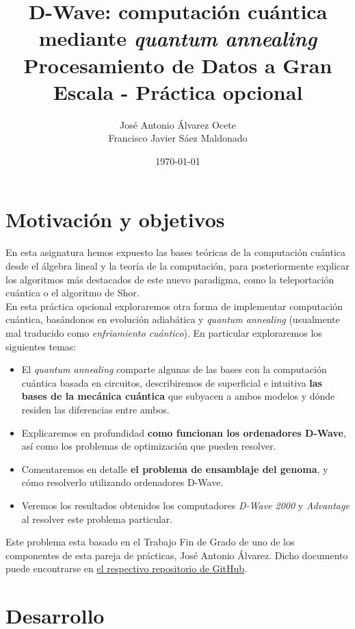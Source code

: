 \documentclass[11pt]{article}
\author{José Antonio Álvarez Ocete\\ Francisco Javier Sáez Maldonado}
\date{\today}
\title{D-Wave: computación cuántica mediante \emph{quantum annealing}\\\medskip
\large Procesamiento de Datos a Gran Escala - Práctica opcional}
\begin{document}
\maketitle

\tableofcontents

\section{Motivación y objetivos}

En esta asignatura hemos expuesto las bases teóricas de la computación cuántica desde el álgebra lineal y la teoría de la computación, para posteriormente explicar los algoritmos más destacados de este nuevo paradigma, como la teleportación cuántica o el algoritmo de Shor. \\

En esta práctica opcional exploraremos otra forma de implementar computación cuántica, basándonos en evolución adiabática y \emph{quantum annealing} (usualmente mal traducido como \emph{enfriamiento cuántico}). En particular exploraremos los siguientes temas:

\begin{itemize}
	\item El \emph{quantum annealing} comparte algunas de las bases con la computación cuántica basada en circuitos, describiremos de superficial e intuitiva \textbf{las bases de la mecánica cuántica} que subyacen a ambos modelos y dónde residen las diferencias entre ambos.
	
	\item Explicaremos en profundidad \textbf{como funcionan los ordenadores D-Wave}, así como los problemas de optimización que pueden resolver.

	\item Comentaremos en detalle \textbf{el problema de ensamblaje del genoma}, y cómo resolverlo utilizando ordenadores D-Wave.
	
	\item Veremos los resultados obtenidos los computadores \emph{D-Wave 2000} y \emph{Advantage} al resolver este problema particular.
\end{itemize}

Este problema esta basado en el Trabajo Fin de Grado de uno de los componentes de esta pareja de prácticas, José Antonio Álvarez. Dicho documento puede encontrarse en \href{https://github.com/Ocete/TFG/blob/main/thesis.pdf}{el respectivo repositorio de GitHub}.

\section{Desarrollo}
\end{document}
